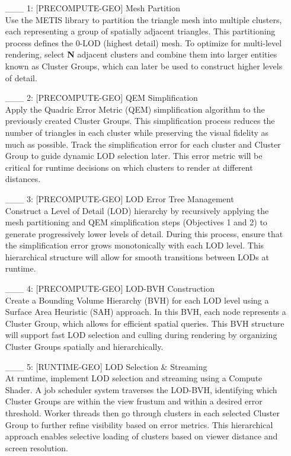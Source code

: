 \documentclass {article}
\begin{document}
\begin{enumerate}
     \item[\_\_\_ 1:]  [PRECOMPUTE-GEO] Mesh Partition
     \\ Use the METIS library to partition the triangle mesh into multiple clusters, each representing a group of spatially 
     adjacent triangles. This partitioning process defines the 0-LOD (highest detail) mesh. To optimize for multi-level 
     rendering, select {\bf N} adjacent clusters and combine them into larger entities known as Cluster Groups, which can 
     later be used to construct higher levels of detail.
 
     \item[\_\_\_ 2:]  [PRECOMPUTE-GEO] QEM Simplification
     \\ Apply the Quadric Error Metric (QEM) simplification algorithm to the previously created Cluster Groups. This 
     simplification process reduces the number of triangles in each cluster while preserving the visual fidelity as much as 
     possible. Track the simplification error for each cluster and Cluster Group to guide dynamic LOD selection later. This 
     error metric will be critical for runtime decisions on which clusters to render at different distances.
 
     \item[\_\_\_ 3:]  [PRECOMPUTE-GEO] LOD Error Tree Management
     \\ Construct a Level of Detail (LOD) hierarchy by recursively applying the mesh partitioning and QEM simplification 
     steps (Objectives 1 and 2) to generate progressively lower levels of detail. During this process, ensure that the 
     simplification error grows monotonically with each LOD level. This hierarchical structure will allow for smooth 
     transitions between LODs at runtime.
 
     \item[\_\_\_ 4:]  [PRECOMPUTE-GEO] LOD-BVH Construction
     \\ Create a Bounding Volume Hierarchy (BVH) for each LOD level using a Surface Area Heuristic (SAH) approach. In this 
     BVH, each node represents a Cluster Group, which allows for efficient spatial queries. This BVH structure will support 
     fast LOD selection and culling during rendering by organizing Cluster Groups spatially and hierarchically.
 
     \item[\_\_\_ 5:]  [RUNTIME-GEO] LOD Selection \& Streaming
     \\ At runtime, implement LOD selection and streaming using a Compute Shader. A job scheduler system traverses the 
     LOD-BVH, identifying which Cluster Groups are within the view frustum and within a desired error threshold. Worker 
     threads then go through clusters in each selected Cluster Group to further refine visibility based on error metrics. 
     This hierarchical approach enables selective loading of clusters based on viewer distance and screen resolution.
 

\end{enumerate}
\end{document}
